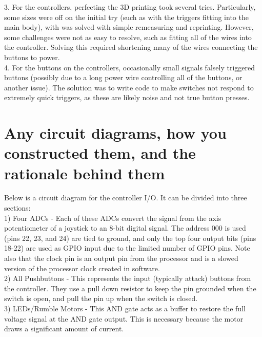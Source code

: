 \documentclass[12pt]{article} %
\begin{document}
3. For the controllers, perfecting the 3D printing took several tries. Particularly, some sizes were off on the initial try (such as with the triggers fitting into the main body), with was solved with simple remeasuring and reprinting. However, some challenges were not as easy to resolve, such as fitting all of the wires into the controller. Solving this required shortening many of the wires connecting the buttons to power.\\

4. For the buttons on the controllers, occasionally small signals falsely triggered buttons (possibly due to a long power wire controlling all of the buttons, or another issue). The solution was to write code to make switches not respond to extremely quick triggers, as these are likely noise and not true button presses.\\

\section{Any circuit diagrams, how you constructed them, and the rationale behind them}
Below is a circuit diagram for the controller I/O. It can be divided into three sections:\\
1) Four ADCs - Each of these ADCs convert the signal from the axis potentiometer of a joystick to an 8-bit digital signal. The address 000 is used (pins 22, 23, and 24) are tied to ground, and only the top four output bits (pins 18-22) are used as GPIO input due to the limited number of GPIO pins. Note also that the clock pin is an output pin from the processor and is a slowed version of the processor clock created in software.\\

2) All Pushbuttons - This represents the input (typically attack) buttons from the controller. They use a pull down resistor to keep the pin grounded when the switch is open, and pull the pin up when the switch is closed.\\

3) LEDs/Rumble Motors - This AND gate acts as a buffer to restore the full voltage signal at the AND gate output. This is necessary because the motor draws a significant amount of current.\\
\end{document}
